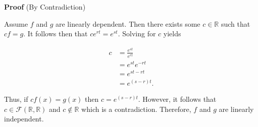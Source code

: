 \documentclass[12pt, a4paper]{article}
\begin{document}
\begin{addmargin}[1.4em]{1.4em}

    \noindent\textbf{Proof} (By Contradiction)
    
    \vspace{2mm}
    
    \noindent Assume $f$ and $g$ are linearly dependent. Then there exists some $c\in\mathbb{R}$ such that $cf=g$. It follows then that $ce^{rt}=e^{st}$. Solving for $c$ yields 
    
    \begin{equation*}
        \begin{split}
            c& =\frac{e^{st}}{e^{rt}} \\
            & =e^{st}e^{-rt} \\
            & =e^{st-rt} \\
            & =e^{(s-r)t}.
        \end{split}
    \end{equation*}
    
    \noindent Thus, if $cf(x)=g(x)$ then $c=e^{(s-r)t}$. However, it follows that $c\in\mathcal{F}(\mathbb{R},\mathbb{R})$ and $c\notin\mathbb{R}$ which is a contradiction. Therefore, $f$ and $g$ are linearly independent.\hspace{7mm}\blacksquare

\end{addmargin}
 
 
\end{document}
